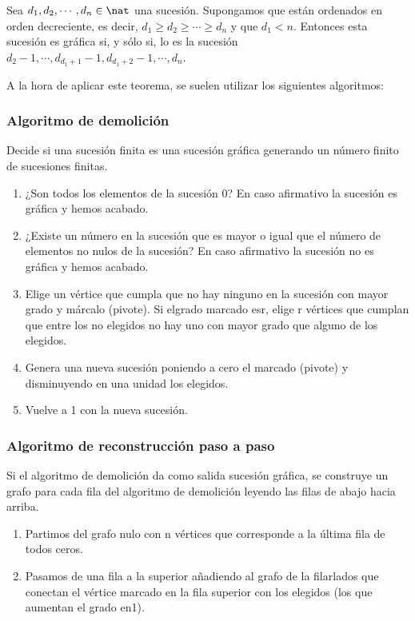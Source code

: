 \begin{nth}
    Sea $d_1,d_2,\cdots,d_n \in \nat$ una sucesión. Supongamos que están ordenados en orden decreciente, es decir, $d_1 \geq d_2 \geq \cdots \geq d_n$ y que $d_1 < n$.
    Entonces esta sucesión es gráfica si, y sólo si, lo es la sucesión $d_2 -1, \cdots, d_{d_1+1}-1, d_{d_1+2}-1, \cdots, d_n$.
\end{nth}

A la hora de aplicar este teorema, se suelen utilizar los siguientes algoritmos:

\subsubsection{Algoritmo de demolición}
Decide si una sucesión finita es una sucesión gráfica generando un número finito de sucesiones finitas.
\begin{enumerate}
    \item ¿Son todos los elementos de la sucesión 0? En caso afirmativo la sucesión es gráfica y hemos acabado.
    \item ¿Existe un número en la sucesión que es mayor o igual que el número de elementos no nulos de la sucesión? En caso afirmativo la sucesión no es gráfica y hemos acabado.
    \item Elige un vértice que cumpla que no hay ninguno en la sucesión con mayor grado y márcalo (pivote). Si elgrado marcado esr, elige r vértices que cumplan que entre los no elegidos no hay uno con mayor grado que alguno de los elegidos.
    \item Genera una nueva sucesión poniendo a cero el marcado (pivote) y disminuyendo en una unidad los elegidos.
    \item Vuelve a 1 con la nueva sucesión.
\end{enumerate}

\subsubsection{Algoritmo de reconstrucción paso a paso}
Si el algoritmo de demolición da como salida sucesión gráfica, se construye un grafo para cada fila del algoritmo de demolición leyendo las filas de abajo hacia arriba.
\begin{enumerate}
    \item Partimos del grafo nulo con n vértices que corresponde a la última fila de todos ceros.
    \item Pasamos de una fila a la superior añadiendo al grafo de la filarlados que conectan el vértice marcado en la fila superior con los elegidos (los que aumentan el grado en1).
\end{enumerate}

